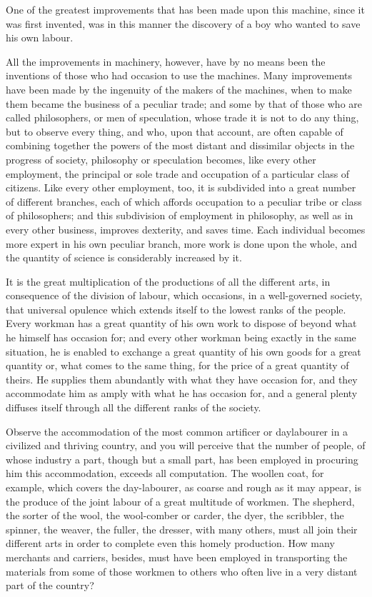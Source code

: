 One of the greatest improvements that has been made upon this machine, since it was first invented, was in this manner the discovery of a boy who wanted to save his own labour.\par

All the improvements in machinery, however, have by no means been the inventions of those who had occasion to use the machines. Many improvements have been made by the ingenuity of the makers of the machines, when to make them became the business of a peculiar trade; and some by that of those who are called philosophers, or men of speculation, whose trade it is not to do any thing, but to observe every thing, and who, upon that account, are often capable of combining together the powers of the most distant and dissimilar objects in the progress of society, philosophy or speculation becomes, like every other employment, the principal or sole trade and occupation of a particular class of citizens. Like every other employment, too, it is subdivided into a great number of different branches, each of which affords occupation to a peculiar tribe or class of philosophers; and this subdivision of employment in philosophy, as well as in every other business, improves dexterity, and saves time. Each individual becomes more expert in his own peculiar branch, more work is done upon the whole, and the quantity of science is considerably increased by it.\par

It is the great multiplication of the productions of all the different arts, in consequence of the division of labour, which occasions, in a well-governed society, that universal opulence which extends itself to the lowest ranks of the people. Every workman has a great quantity of his own work to dispose of beyond what he himself has occasion for; and every other workman being exactly in the same situation, he is enabled to exchange a great quantity of his own goods for a great quantity or, what comes to the same thing, for the price of a great quantity of theirs. He supplies them abundantly with what they have occasion for, and they accommodate him as amply with what he has occasion for, and a general plenty diffuses itself through all the different ranks of the society.\par

Observe the accommodation of the most common artificer or daylabourer in a civilized and thriving country, and you will perceive that the number of people, of whose industry a part, though but a small part, has been employed in procuring him this accommodation, exceeds all computation. The woollen coat, for example, which covers the day-labourer, as coarse and rough as it may appear, is the produce of the joint labour of a great multitude of workmen. The shepherd, the sorter of the wool, the wool-comber or carder, the dyer, the scribbler, the spinner, the weaver, the fuller, the dresser, with many others, must all join their different arts in order to complete even this homely production. How many merchants and carriers, besides, must have been employed in transporting the materials from some of those workmen to others who often live in a very distant part of the country?\par

